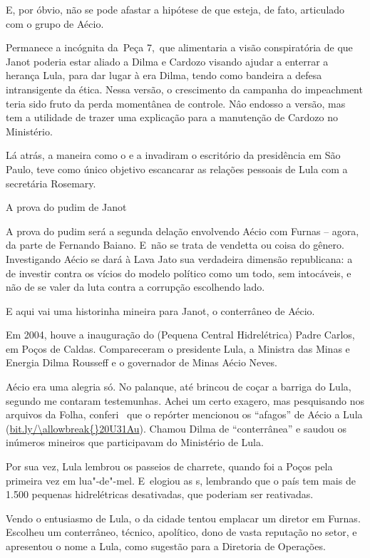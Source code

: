 E, por óbvio, não se pode afastar a hipótese de que esteja, de fato,
articulado com o grupo de Aécio.

Permanece a incógnita da~Peça 7,~que alimentaria a visão conspiratória
de que Janot poderia estar aliado a Dilma e Cardozo visando ajudar a
enterrar a herança Lula, para dar lugar à era Dilma, tendo como bandeira
a defesa intransigente da ética. Nessa versão, o crescimento da campanha
do impeachment teria sido fruto da perda momentânea de controle. Nâo
endosso a versão, mas tem a utilidade de trazer uma explicação para a
manutenção de Cardozo no Ministério.

Lá atrás, a maneira como o  e a  invadiram o escritório da
presidência em São Paulo, teve como único objetivo escancarar as
relações pessoais de Lula com a secretária Rosemary.

A prova do pudim de Janot

A prova do pudim será a segunda delação envolvendo Aécio com Furnas --
agora, da parte de Fernando Baiano. E~não se trata de vendetta ou coisa
do gênero. Investigando Aécio se dará à Lava Jato sua verdadeira
dimensão republicana: a de investir contra os vícios do modelo político
como um todo, sem intocáveis, e não de se valer da luta contra a
corrupção escolhendo lado.

E aqui vai uma historinha mineira para Janot, o conterrâneo de Aécio.~

Em 2004, houve a inauguração do  (Pequena Central Hidrelétrica) Padre
Carlos, em Poços de Caldas. Compareceram o presidente Lula, a Ministra
das Minas e Energia Dilma Rousseff e o governador de Minas Aécio Neves.

Aécio era uma alegria só. No palanque, até brincou de coçar a barriga do
Lula, segundo me contaram testemunhas. Achei um certo exagero, mas
pesquisando nos arquivos da Folha, conferi ~que o repórter mencionou os
``afagos'' de Aécio a Lula (\url{bit.ly/\allowbreak{}20U31Au}). Chamou Dilma
de ``conterrânea'' e saudou os inúmeros mineiros que participavam do
Ministério de Lula.

Por sua vez, Lula lembrou os passeios de charrete, quando foi a Poços
pela primeira vez em lua"-de"-mel. E~elogiou as s, lembrando que o país
tem mais de 1.500 pequenas hidrelétricas desativadas, que poderiam ser
reativadas.

Vendo o entusiasmo de Lula, o  da cidade tentou emplacar um diretor em
Furnas. Escolheu um conterrâneo, técnico, apolítico, dono de vasta
reputação no setor, e apresentou o nome a Lula, como sugestão para a
Diretoria de Operações.

